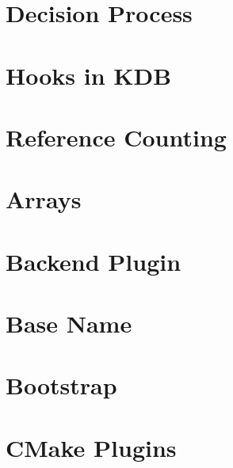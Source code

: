 \let\mypdfximage\pdfximage\def\pdfximage{\immediate\mypdfximage}\documentclass[twoside]{book}
\newcommand{\+}{\discretionary{\mbox{\scriptsize$\hookleftarrow$}}{}{}}
\begin{document}
\chapter{Decision Process}
\label{doc_decisions_5_partially_implemented_decision_process_md}

\chapter{Hooks in KDB}
\label{doc_decisions_5_partially_implemented_hooks_md}

\chapter{Reference Counting}
\label{doc_decisions_5_partially_implemented_reference_counting_md}

\chapter{Arrays}
\label{doc_decisions_5_partially_implemented_warning_array_md}

\chapter{Backend Plugin}
\label{doc_decisions_6_implemented_backend_plugin_md}

\chapter{Base Name}
\label{doc_decisions_6_implemented_base_name_md}

\chapter{Bootstrap}
\label{doc_decisions_6_implemented_bootstrap_md}

\chapter{CMake Plugins}
\label{doc_decisions_6_implemented_cmake_plugins_md}

\end{document}
